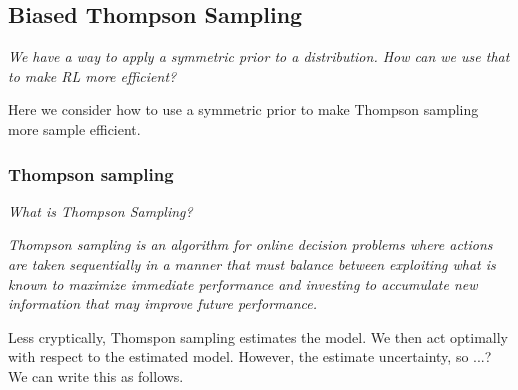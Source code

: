 
%
%

\newpage
\subsection{Biased Thompson Sampling} \label{thompson-sampling}

\begin{displayquote}
\textsl{We have a way to apply a symmetric prior to a distribution.
How can we use that to make RL more efficient?}
\end{displayquote}

Here we consider how to use a symmetric prior to make Thompson sampling more sample efficient.

\subsubsection{Thompson sampling} \label{ts}
\begin{displayquote}
	\textsl{What is Thompson Sampling?}
\end{displayquote}

\begin{displayquote}
	\textit{Thompson sampling is an algorithm for online decision problems where actions are taken sequentially in a manner that
must balance between exploiting what is known to maximize immediate performance and investing to accumulate
new information that may improve future performance.}\cite{Russo2017}
\end{displayquote}

Less cryptically, Thomspon sampling estimates the model. We then act optimally with respect to the estimated model. However, the estimate uncertainty, so ...? We can write this as follows.

